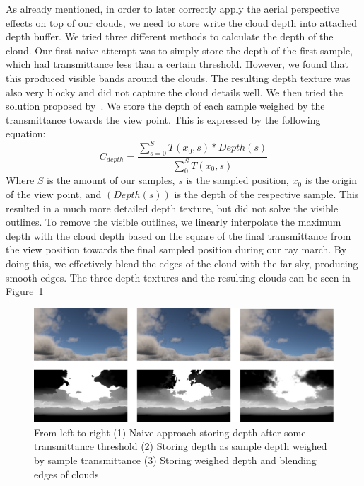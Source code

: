 \documentclass{ctuthesis}
\begin{document}
As already mentioned, in order to later correctly apply the aerial perspective effects on top of
our clouds, we need to store write the cloud depth into attached depth buffer. We tried three 
different methods to calculate the depth of the cloud. Our first naive attempt was to simply store the 
depth of the first sample, which had transmittance less than a certain threshold. However, we found
that this produced visible bands around the clouds. The resulting depth texture was also very
blocky and did not capture the cloud details well. We then tried the solution proposed by~\cite{hillaire2016physically}.
We store the depth of each sample weighed by the transmittance towards the view point. This is expressed
by the following equation:
\begin{equation}
    C_{depth} = \frac{\sum_{s=0}^{S} T(x_{0},s) * Depth(s)}{\sum_{0}^{S} T(x_{0},s)}
\end{equation}
Where $S$ is the amount of our samples, $s$ is the sampled position, $x_{0}$ is the origin of the view point,
and $(Depth(s))$ is the depth of the respective sample. This resulted in a much more detailed depth texture,
but did not solve the visible outlines. To remove the visible outlines, we linearly 
interpolate the maximum depth with the cloud depth based on the square of the final transmittance from the view 
position towards the final sampled position during our ray march. By doing this, we effectively 
blend the edges of the cloud with the far sky, producing smooth edges. The three depth textures
and the resulting clouds can be seen in Figure~\ref{fig:Cloud depths}  

\begin{figure}
        \includegraphics[width=1.0\textwidth]{media/Cloud_depths.png}
        \caption[Cloud depth computation]{From left to right (1) Naive approach storing depth after some transmittance threshold
            (2) Storing depth as sample depth weighed by sample transmittance (3) Storing weighed depth
            and blending edges of clouds}
        \label{fig:Cloud depths}
\end{figure}
\end{document}
